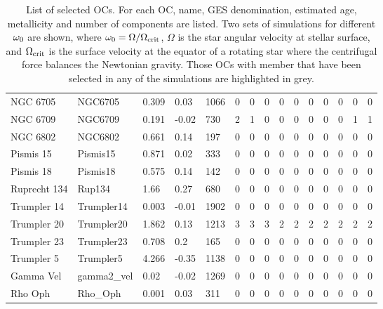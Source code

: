 \documentclass[fleqn,usenatbib]{mnras}
\begin{document}
\begin{table}
\begin{tabular}{|l l l l l || c c c c c | c c c c c|}
            NGC 6705 & NGC6705 & 0.309 & 0.03 & 1066 & 0 & 0 & 0 & 0 & 0 & 0 & 0 & 0 & 0 & 0\\
            \rowcolor{lightgray}
            NGC 6709 & NGC6709 & 0.191 & -0.02 & 730 & 2 & 1 & 0 & 0 & 0 & 0 & 0 & 0 & 1 & 1\\
            NGC 6802 & NGC6802 & 0.661 & 0.14 & 197 & 0 & 0 & 0 & 0 & 0 & 0 & 0 & 0 & 0 & 0\\
            Pismis 15 & Pismis15 & 0.871 & 0.02 & 333 & 0 & 0 & 0 & 0 & 0 & 0 & 0 & 0 & 0 & 0\\
            Pismis 18 & Pismis18 & 0.575 & 0.14 & 142 & 0 & 0 & 0 & 0 & 0 & 0 & 0 & 0 & 0 & 0\\
            Ruprecht 134 & Rup134 & 1.66 & 0.27 & 680 & 0 & 0 & 0 & 0 & 0 & 0 & 0 & 0 & 0 & 0\\
            Trumpler 14 & Trumpler14 & 0.003 & -0.01 & 1902 & 0 & 0 & 0 & 0 & 0 & 0 & 0 & 0 & 0 & 0\\
            \rowcolor{lightgray}
            Trumpler 20 & Trumpler20 & 1.862 & 0.13 & 1213 & 3 & 3 & 3 & 2 & 2 & 2 & 2 & 2 & 2 & 2\\
            Trumpler 23 & Trumpler23 & 0.708 & 0.2 & 165 & 0 & 0 & 0 & 0 & 0 & 0 & 0 & 0 & 0 & 0\\
            Trumpler 5 & Trumpler5 & 4.266 & -0.35 & 1138 & 0 & 0 & 0 & 0 & 0 & 0 & 0 & 0 & 0 & 0\\
            Gamma Vel & gamma2\_vel & 0.02 & -0.02 & 1269 & 0 & 0 & 0 & 0 & 0 & 0 & 0 & 0 & 0 & 0\\
            Rho Oph & Rho\_Oph & 0.001 & 0.03 & 311 & 0 & 0 & 0 & 0 & 0 & 0 & 0 & 0 & 0 & 0\\           
            \hline
	\end{tabular}
 	\caption{List of selected OCs. For each OC, name, GES denomination, estimated age, metallicity and number of components are listed. Two sets of simulations for different $\omega_{\mathrm{0}}$ are shown, where $\omega_{\mathrm{0}} = \Omega / \Omega_{\mathrm{crit}}$, $\Omega$ is the star angular velocity at stellar surface, and $\Omega_{\mathrm{crit}}$ is the surface velocity at the equator of a rotating star where the centrifugal force balances the Newtonian gravity. Those OCs with member that have been selected in any of the simulations are highlighted in grey.}
  	\label{tab:oc_full_list}
\end{table}


\clearpage
\end{document}
